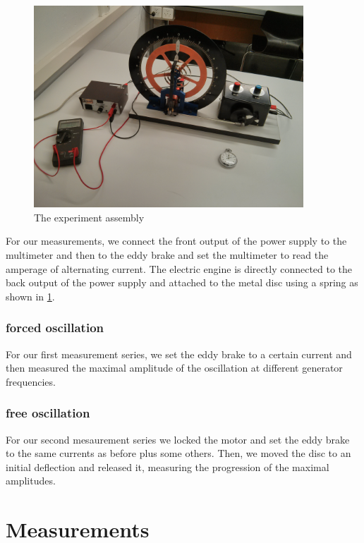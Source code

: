 \documentclass{scrreprt}
\begin{document}
\begin{figure}[H]
	\centering
  \includegraphics[width=0.9\textwidth]{img/assembly.jpg}
	\caption{The experiment assembly}
	\label{fig:assembly}
\end{figure}

For our measurements, we connect the front output of the power supply to the multimeter and then to the eddy brake and set the multimeter to read the amperage of alternating current. The electric engine is directly connected to the back output of the power supply and attached to the metal disc using a spring as shown in \ref{fig:assembly}.
\subsubsection{forced oscillation}
For our first measurement series, we set the eddy brake to a certain current and then measured the maximal amplitude of the oscillation at different generator frequencies.
\subsubsection{free oscillation}
For our second mesaurement series we locked the motor and set the eddy brake to the same currents as before plus some others. Then, we moved the disc to an initial deflection and released it, measuring the progression of the maximal amplitudes.

\section{Measurements}
\end{document}

